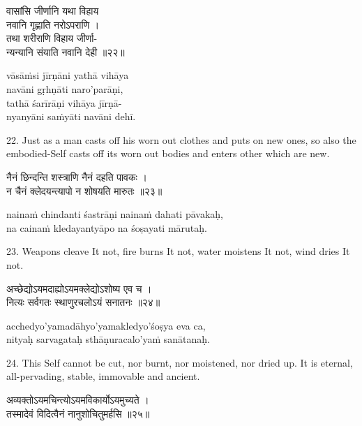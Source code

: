\begin{gitaverse}
वासांसि जीर्णानि यथा विहाय \\
\tab नवानि गृह्णाति नरोऽपराणि । \\
तथा शरीराणि विहाय जीर्णा- \\
\tab न्यन्यानि संयाति नवानि देही ॥२२॥
\end{gitaverse}

\begin{transliteration}
vāsāṁsi jīrṇāni yathā vihāya \\
\tab navāni gṛhṇāti naro'parāṇi, \\
tathā śarīrāṇi vihāya jīrṇā- \\
\tab nyanyāni saṁyāti navāni dehī.
\end{transliteration}

22. Just as a man casts off his worn out clothes and puts on new ones, so also
the embodied-Self casts off its worn out bodies and enters other which are new.

\begin{gitaverse}
नैनं छिन्दन्ति शस्त्राणि नैनं दहति पावकः । \\
न चैनं क्लेदयन्त्यापो न शोषयति मारुतः ॥२३॥
\end{gitaverse}

\begin{transliteration}
nainaṁ chindanti śastrāṇi nainaṁ dahati pāvakaḥ, \\
na cainaṁ kledayantyāpo na śoṣayati mārutaḥ.
\end{transliteration}

23. Weapons cleave It not, fire burns It not, water moistens It not, wind dries
It not.

\begin{gitaverse}
अच्छेद्योऽयमदाह्योऽयमक्लेद्योऽशोष्य एव च । \\
नित्यः सर्वगतः स्थाणुरचलोऽयं सनातनः ॥२४॥
\end{gitaverse}

\begin{transliteration}
acchedyo'yamadāhyo'yamakledyo'śoṣya eva ca, \\
nityaḥ sarvagataḥ sthāṇuracalo'yaṁ sanātanaḥ.
\end{transliteration}

24. This Self cannot be cut, nor burnt, nor moistened, nor dried up. It is
eternal, all-pervading, stable, immovable and ancient.

\begin{gitaverse}
अव्यक्तोऽयमचिन्त्योऽयमविकार्योऽयमुच्यते । \\
तस्मादेवं विदित्वैनं नानुशोचितुमर्हसि ॥२५॥
\end{gitaverse}

